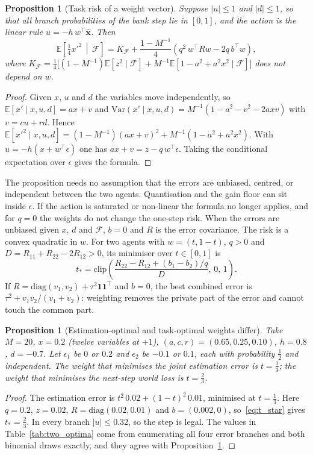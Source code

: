\documentclass[12pt]{article}
\newtheorem{proposition}[theorem]{Proposition}
\theoremstyle{definition}
\begin{document}
\begin{proposition}[Task risk of a weight vector]\label{prop:task_risk}
Suppose $|u|\le1$ and $|d|\le1$, so that all branch probabilities of the bank step lie in $[0,1]$, and the action is the linear rule $u=-h\,w^\top\hat{\boldsymbol x}$. Then
\[
\mathbb E\!\left[\tfrac14x'^2\,\middle|\,\mathcal F\right]
=K_{\mathcal F}+\frac{1-M^{-1}}4\left(q^2\,w^\top Rw-2q\,b^\top w\right),
\]
where $K_{\mathcal F}=\tfrac14\bigl[(1-M^{-1})\mathbb E[z^2\mid\mathcal F]+M^{-1}\mathbb E[1-a^2+a^2x^2\mid\mathcal F]\bigr]$ does not depend on $w$.
\end{proposition}
\begin{proof}
Given $x$, $u$ and $d$ the variables move independently, so $\mathbb E[x'\mid x,u,d]=ax+v$ and $\mathrm{Var}(x'\mid x,u,d)=M^{-1}(1-a^2-v^2-2axv)$ with $v=cu+rd$. Hence $\mathbb E[x'^2\mid x,u,d]=(1-M^{-1})(ax+v)^2+M^{-1}(1-a^2+a^2x^2)$. With $u=-h(x+w^\top\epsilon)$ one has $ax+v=z-q\,w^\top\epsilon$. Taking the conditional expectation over $\epsilon$ gives the formula.
\end{proof}

The proposition needs no assumption that the errors are unbiased, centred, or independent between the two agents. Quantisation and the gain floor can sit inside $\epsilon$. If the action is saturated or non-linear the formula no longer applies, and for $q=0$ the weights do not change the one-step risk. When the errors are unbiased given $x$, $d$ and $\mathcal F$, $b=0$ and $R$ is the error covariance. The risk is a convex quadratic in $w$. For two agents with $w=(t,1-t)$, $q>0$ and $D=R_{11}+R_{22}-2R_{12}>0$, its minimiser over $t\in[0,1]$ is
\begin{equation}\label{eq:t_star}
t_*=\mathrm{clip}\!\left(\frac{R_{22}-R_{12}+(b_1-b_2)/q}{D},\,0,\,1\right).
\end{equation}
If $R=\mathrm{diag}(v_1,v_2)+\tau^2\mathbf 1\mathbf 1^\top$ and $b=0$, the best combined error is $\tau^2+v_1v_2/(v_1+v_2)$: weighting removes the private part of the error and cannot touch the common part.

\begin{proposition}[Estimation-optimal and task-optimal weights differ]\label{prop:two_optima}
Take $M=20$, $x=0.2$ (twelve variables at $+1$), $(a,c,r)=(0.65,0.25,0.10)$, $h=0.8$, $d=-0.7$. Let $\epsilon_1$ be $0$ or $0.2$ and $\epsilon_2$ be $-0.1$ or $0.1$, each with probability $\tfrac12$ and independent. The weight that minimises the joint estimation error is $t=\tfrac13$; the weight that minimises the next-step world loss is $t=\tfrac23$.
\end{proposition}
\begin{proof}
The estimation error is $t^2\,0.02+(1-t)^2\,0.01$, minimised at $t=\tfrac13$. Here $q=0.2$, $z=0.02$, $R=\mathrm{diag}(0.02,0.01)$ and $b=(0.002,0)$, so~\eqref{eq:t_star} gives $t_*=\tfrac23$. In every branch $|u|\le0.32$, so the step is legal. The values in Table~\ref{tab:two_optima} come from enumerating all four error branches and both binomial draws exactly, and they agree with Proposition~\ref{prop:task_risk}.
\end{proof}
\end{document}
